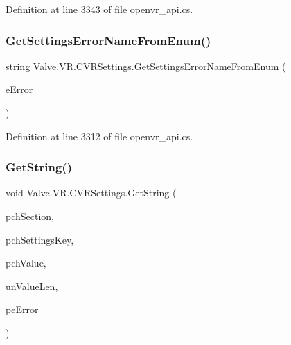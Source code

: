 Definition at line 3343 of file openvr\+\_\+api.\+cs.

\mbox{\label{class_valve_1_1_v_r_1_1_c_v_r_settings_ac84c519d89bb27418816853dd20b093f}} 
\subsubsection{\texorpdfstring{GetSettingsErrorNameFromEnum()}{GetSettingsErrorNameFromEnum()}}
{\footnotesize\ttfamily string Valve.\+V\+R.\+C\+V\+R\+Settings.\+Get\+Settings\+Error\+Name\+From\+Enum (\begin{DoxyParamCaption}\item[{\mbox{\hyperlink{namespace_valve_1_1_v_r_aeab7722b211afc3885ed77faa931291f}{E\+V\+R\+Settings\+Error}}}]{e\+Error }\end{DoxyParamCaption})}



Definition at line 3312 of file openvr\+\_\+api.\+cs.

\mbox{\label{class_valve_1_1_v_r_1_1_c_v_r_settings_ac27965939d598a96e3a03ed59544c5a6}} 
\subsubsection{\texorpdfstring{GetString()}{GetString()}}
{\footnotesize\ttfamily void Valve.\+V\+R.\+C\+V\+R\+Settings.\+Get\+String (\begin{DoxyParamCaption}\item[{string}]{pch\+Section,  }\item[{string}]{pch\+Settings\+Key,  }\item[{System.\+Text.\+String\+Builder}]{pch\+Value,  }\item[{uint}]{un\+Value\+Len,  }\item[{ref \mbox{\hyperlink{namespace_valve_1_1_v_r_aeab7722b211afc3885ed77faa931291f}{E\+V\+R\+Settings\+Error}}}]{pe\+Error }\end{DoxyParamCaption})}



